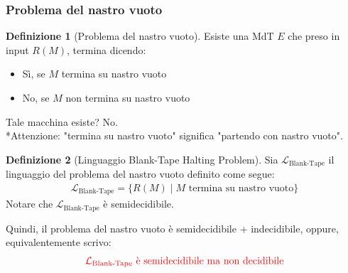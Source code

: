 \documentclass{article}  %
\theoremstyle{definition}
\newtheorem{definition}{Definizione}[section]
\begin{document}
\subsubsection{Problema del nastro vuoto}
\begin{definition}[Problema del nastro vuoto]
  Esiste una MdT $E$ che preso in input $R(M)$, termina dicendo:
  \begin{itemize}
    \item Sì, se $M$ termina su nastro vuoto
    \item No, se $M$ non termina su nastro vuoto
  \end{itemize}
  Tale macchina esiste? No. \\
  \footnotesize %
  *Attenzione: "termina su nastro vuoto" significa "partendo con nastro vuoto".
\end{definition}
\begin{definition}[Linguaggio Blank-Tape Halting Problem]
  Sia $\mathcal{L}_{\text{Blank-Tape}}$ il linguaggio del problema del nastro vuoto definito come segue:
  \begin{align*}
    \mathcal{L}_{\text{Blank-Tape}} = \{R(M) \mid M \text{ termina su nastro vuoto}\}
  \end{align*}
  Notare che $\mathcal{L}_{\text{Blank-Tape}}$ è semidecidibile.
\end{definition}
Quindi, il problema del nastro vuoto è semidecidibile + indecidibile, oppure, equivalentemente scrivo:
\begin{align*}
  \textcolor{red}{\mathcal{L}_{\text{Blank-Tape}} \text{ è semidecidibile ma non decidibile}}
\end{align*}
\end{document}
